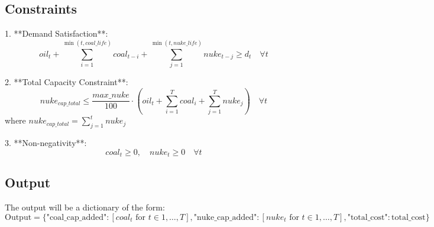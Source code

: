 \documentclass{article}
\begin{document}
\subsection*{Constraints}

1. **Demand Satisfaction**:
\[
oil_t + \sum_{i=1}^{\min(t, coal\_life)} coal_{t-i} + \sum_{j=1}^{\min(t, nuke\_life)} nuke_{t-j} \geq d_t \quad \forall t
\]

2. **Total Capacity Constraint**:
\[
nuke_{cap\_total} \leq \frac{max\_nuke}{100} \cdot (oil_t + \sum_{i=1}^{T} coal_i + \sum_{j=1}^{T} nuke_j) \quad \forall t
\]
where \( nuke_{cap\_total} = \sum_{j=1}^{t} nuke_j \)

3. **Non-negativity**:
\[
coal_t \geq 0, \quad nuke_t \geq 0 \quad \forall t
\]

\subsection*{Output}
The output will be a dictionary of the form:
\[
\text{Output} = \{ 
    \text{"coal\_cap\_added"}: [coal_t \text{ for } t \in 1, \ldots, T], 
    \text{"nuke\_cap\_added"}: [nuke_t \text{ for } t \in 1, \ldots, T], 
    \text{"total\_cost"}: \text{total\_cost} 
\}
\]
\end{document}
